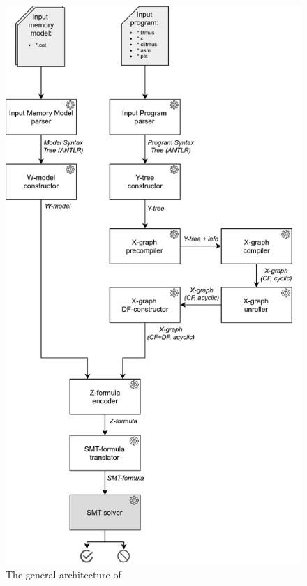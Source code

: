 \begin{figure}%
    \centering
  \includegraphics[width=\textwidth,height=\textheight,keepaspectratio]{img/my/draw.io/general_arch.png}
  \caption{The general architecture of \porthos[2]}
  \label{fig:arch}
\end{figure}

